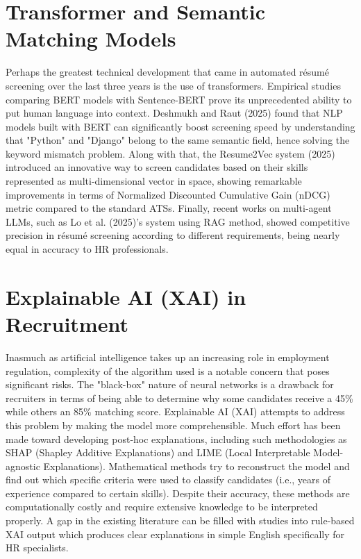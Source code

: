\section{Transformer and Semantic Matching Models}
Perhaps the greatest technical development that came in automated résumé screening over the last three years is the use of transformers. Empirical studies comparing BERT models with Sentence-BERT prove its unprecedented ability to put human language into context. Deshmukh and Raut (2025) found that NLP models built with BERT can significantly boost screening speed by understanding that "Python" and "Django" belong to the same semantic field, hence solving the keyword mismatch problem. Along with that, the Resume2Vec system (2025) introduced an innovative way to screen candidates based on their skills represented as multi-dimensional vector in space, showing remarkable improvements in terms of Normalized Discounted Cumulative Gain (nDCG) metric compared to the standard ATSs. Finally, recent works on multi-agent LLMs, such as Lo et al. (2025)'s system using RAG method, showed competitive precision in résumé screening according to different requirements, being nearly equal in accuracy to HR professionals.

\section{Explainable AI (XAI) in Recruitment}
Inasmuch as artificial intelligence takes up an increasing role in employment regulation, complexity of the algorithm used is a notable concern that poses significant risks. The "black-box" nature of neural networks is a drawback for recruiters in terms of being able to determine why some candidates receive a 45\% while others an 85\% matching score. Explainable AI (XAI) attempts to address this problem by making the model more comprehensible. Much effort has been made toward developing post-hoc explanations, including such methodologies as SHAP (Shapley Additive Explanations) and LIME (Local Interpretable Model-agnostic Explanations). Mathematical methods try to reconstruct the model and find out which specific criteria were used to classify candidates (i.e., years of experience compared to certain skills). Despite their accuracy, these methods are computationally costly and require extensive knowledge to be interpreted properly. A gap in the existing literature can be filled with studies into rule-based XAI output which produces clear explanations in simple English specifically for HR specialists.


